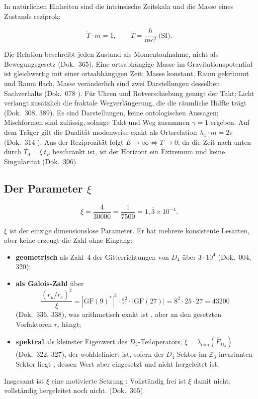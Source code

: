 In natürlichen Einheiten sind die intrinsische Zeitskala und die Masse eines Zustands reziprok:
\begin{ffkern}
\begin{equation}
  \tilde T\cdot m=1,\qquad \tilde T=\frac{\hbar}{mc^2}\ \text{(SI)}.
\end{equation}
\end{ffkern}%
Die Relation beschreibt jeden Zustand als Momentaufnahme, nicht als Bewegungsgesetz
(Dok.~365). Eine ortsabhängige Masse im Gravitationspotential ist gleichwertig mit einer
ortsabhängigen Zeit; \glqq Masse konstant, Raum gekrümmt\grqq{} und \glqq Raum flach, Masse
veränderlich\grqq{} sind zwei Darstellungen desselben Sachverhalts (Dok.~078 \KM). Für Uhren und
Rotverschiebung genügt der Takt; Licht verlangt zusätzlich die fraktale Wegverlängerung, die die
räumliche Hälfte trägt (Dok.~308, 389). Es sind Darstellungen, keine ontologischen Aussagen;
Mischformen sind zulässig, solange Takt und Weg zusammen $\gamma=1$ ergeben. Auf dem
Träger gilt die Dualität modenweise exakt als Ortsrelation $\lambda_4\cdot m=2\pi$
(Dok.~314 \KM). Aus der Reziprozität folgt $E\to\infty\Leftrightarrow T\to0$; da die Zeit nach
unten durch $T_0=\xi\,t_P$ beschränkt ist, ist der Horizont ein Extremum und keine
Singularität (Dok.~306).

\subsection{Der Parameter \texorpdfstring{$\xi$}{xi}}

\begin{ffkern}
\begin{equation}
  \xi=\frac{4}{30000}=\frac{1}{7500}=1{,}\overline{3}\times10^{-4}.
\end{equation}
\end{ffkern}%
$\xi$ ist der einzige dimensionslose Parameter. Er hat mehrere konsistente Lesarten, aber keine
erzeugt die Zahl ohne Eingang:
\begin{itemize}[leftmargin=*,itemsep=2pt]
\item \textbf{geometrisch} als Zahl~4 der Gitterrichtungen von $D_4$ über $3\cdot10^4$
  (Dok.~004, 320);
\item \textbf{als Galois-Zahl} über
\begin{equation}
  \frac{(r_\mu/r_e)^2}{\xi}=|\mathrm{GF}(9)^*|^2\cdot5^2\cdot|\mathrm{GF}(27)|=8^2\cdot25\cdot27=43200
\end{equation}
(Dok.~336, 338), was arithmetisch exakt ist \BM, aber an den gesetzten Vorfaktoren $r_i$ hängt;
\item \textbf{spektral} als kleinster Eigenwert des $D_4$-Teiloperators,
  $\xi=\lambda_{\min}(\hat F_{D_4})$ (Dok.~322, 327), der wohldefiniert ist, sofern der
  $D_4$-Sektor im $\mathbb Z_3$-invarianten Sektor liegt \BM, dessen Wert aber eingesetzt und
  nicht hergeleitet ist.
\end{itemize}
Insgesamt ist $\xi$ eine
motivierte Setzung \SM: \glqq Vollständig frei ist $\xi$ damit nicht; vollständig hergeleitet noch
nicht.\grqq{} (Dok.~365).

